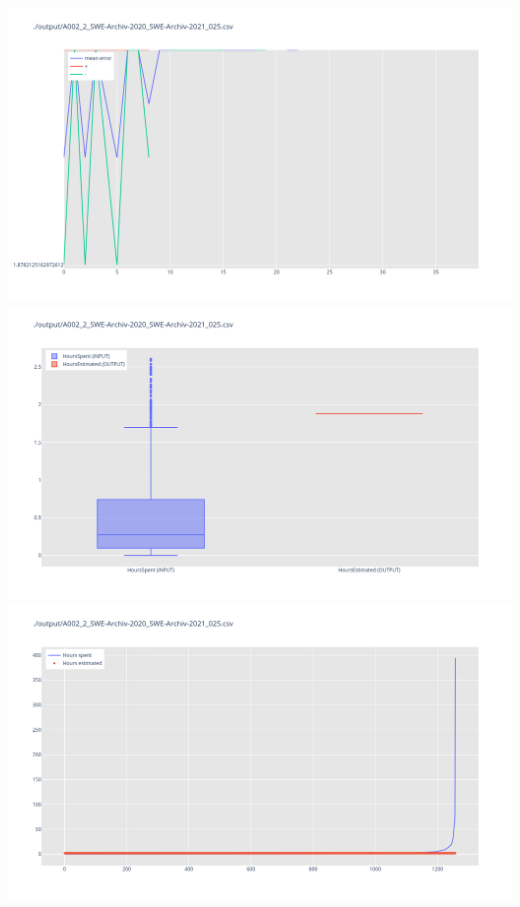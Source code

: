 \includegraphics[width=\textwidth]{Scripts/output/A002_2_SWE-Archiv-2020_SWE-Archiv-2021_025.csv.error_distribution.png}
\includegraphics[width=\textwidth]{Scripts/output/A002_2_SWE-Archiv-2020_SWE-Archiv-2021_025.csv.png}
\includegraphics[width=\textwidth]{Scripts/output/A002_2_SWE-Archiv-2020_SWE-Archiv-2021_025.csv.scatter.png}
